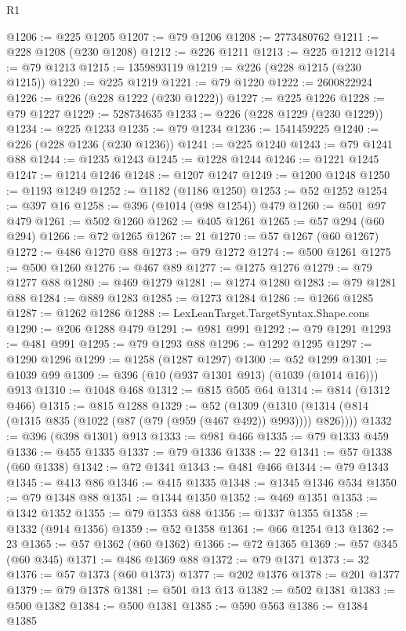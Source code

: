 \begin{lexlean}{R1}
\begin{coremodule}
@1206 := @225 @1205
@1207 := @79 @1206
@1208 := 2773480762
@1211 := @228 @1208 (@230 @1208)
@1212 := @226 @1211
@1213 := @225 @1212
@1214 := @79 @1213
@1215 := 1359893119
@1219 := @226 (@228 @1215 (@230 @1215))
@1220 := @225 @1219
@1221 := @79 @1220
@1222 := 2600822924
@1226 := @226 (@228 @1222 (@230 @1222))
@1227 := @225 @1226
@1228 := @79 @1227
@1229 := 528734635
@1233 := @226 (@228 @1229 (@230 @1229))
@1234 := @225 @1233
@1235 := @79 @1234
@1236 := 1541459225
@1240 := @226 (@228 @1236 (@230 @1236))
@1241 := @225 @1240
@1243 := @79 @1241 @88
@1244 := @1235 @1243
@1245 := @1228 @1244
@1246 := @1221 @1245
@1247 := @1214 @1246
@1248 := @1207 @1247
@1249 := @1200 @1248
@1250 := @1193 @1249
@1252 := @1182 (@1186 @1250)
@1253 := @52 @1252
@1254 := @397 @16
@1258 := @396 (@1014 (@98 @1254)) @479
@1260 := @501 @97 @479
@1261 := @502 @1260
@1262 := @405 @1261
@1265 := @57 @294 (@60 @294)
@1266 := @72 @1265
@1267 := 21
@1270 := @57 @1267 (@60 @1267)
@1272 := @486 @1270 @88
@1273 := @79 @1272
@1274 := @500 @1261
@1275 := @500 @1260
@1276 := @467 @89
@1277 := @1275 @1276
@1279 := @79 @1277 @88
@1280 := @469 @1279
@1281 := @1274 @1280
@1283 := @79 @1281 @88
@1284 := @889 @1283
@1285 := @1273 @1284
@1286 := @1266 @1285
@1287 := @1262 @1286
@1288 := LexLeanTarget.TargetSyntax.Shape.cons
@1290 := @206 @1288 @479
@1291 := @981 @991
@1292 := @79 @1291
@1293 := @481 @991
@1295 := @79 @1293 @88
@1296 := @1292 @1295
@1297 := @1290 @1296
@1299 := @1258 (@1287 @1297)
@1300 := @52 @1299
@1301 := @1039 @99
@1309 := @396 (@10 (@937 @1301 @913) (@1039 (@1014 @16))) @913
@1310 := @1048 @468
@1312 := @815 @505 @64
@1314 := @814 (@1312 @466)
@1315 := @815 @1288
@1329 := @52
    (@1309 (@1310 (@1314 (@814 (@1315 @835 (@1022 (@87 (@79 (@959 (@467 @492)) @993)))) @826))))
@1332 := @396 (@398 @1301) @913
@1333 := @981 @466
@1335 := @79 @1333 @459
@1336 := @455 @1335
@1337 := @79 @1336
@1338 := 22
@1341 := @57 @1338 (@60 @1338)
@1342 := @72 @1341
@1343 := @481 @466
@1344 := @79 @1343
@1345 := @413 @86
@1346 := @415 @1335
@1348 := @1345 @1346 @534
@1350 := @79 @1348 @88
@1351 := @1344 @1350
@1352 := @469 @1351
@1353 := @1342 @1352
@1355 := @79 @1353 @88
@1356 := @1337 @1355
@1358 := @1332 (@914 @1356)
@1359 := @52 @1358
@1361 := @66 @1254 @13
@1362 := 23
@1365 := @57 @1362 (@60 @1362)
@1366 := @72 @1365
@1369 := @57 @345 (@60 @345)
@1371 := @486 @1369 @88
@1372 := @79 @1371
@1373 := 32
@1376 := @57 @1373 (@60 @1373)
@1377 := @202 @1376
@1378 := @201 @1377
@1379 := @79 @1378
@1381 := @501 @13 @13
@1382 := @502 @1381
@1383 := @500 @1382
@1384 := @500 @1381
@1385 := @590 @563
@1386 := @1384 @1385

\end{coremodule}
\end{lexlean}
